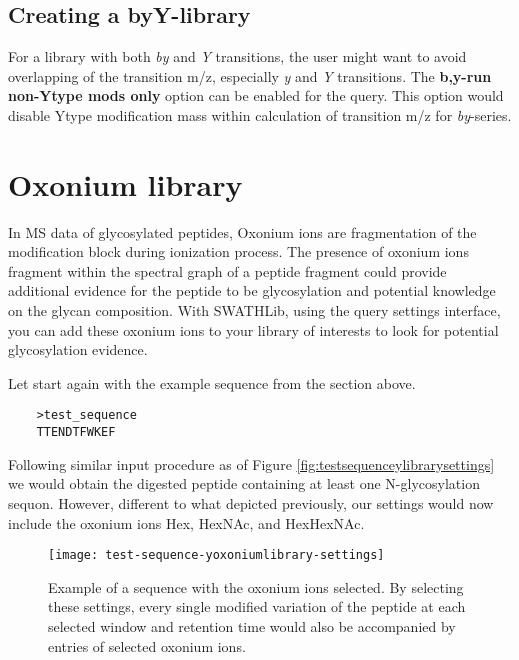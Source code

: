 \documentclass[../manual.tex]{subfiles}
\begin{document}
\subsection{Creating a byY-library}
For a library with both \emph{by} and \emph{Y} transitions, the user might want to avoid overlapping of the transition m/z, especially \emph{y} and \emph{Y} transitions. The \textbf{b,y-run non-Ytype mods only} option can be enabled for the query. This option would disable Ytype modification mass within calculation of transition m/z for \emph{by}-series.

\section{Oxonium library}
In MS data of glycosylated peptides, Oxonium ions are fragmentation of the modification block during ionization process. The presence of oxonium ions fragment within the spectral graph of a peptide fragment could provide additional evidence for the peptide to be glycosylation and potential knowledge on the glycan composition. With SWATHLib, using the query settings interface, you can add these oxonium ions to your library of interests to look for potential glycosylation evidence.\par

Let start again with the example sequence from the section above.\par
\begin{verbatim}
	>test_sequence
	TTENDTFWKEF
\end{verbatim}

Following similar input procedure as of Figure \ref{fig:testsequenceylibrarysettings} we would obtain the digested peptide containing at least one N-glycosylation sequon. However, different to what depicted previously, our settings would now include the oxonium ions Hex, HexNAc, and HexHexNAc.\par

\begin{figure}[H]
	\centering
	\begin{framed}
        \centering
        \begin{adjustbox}{width=1\textwidth}
			\texttt{[image: test-sequence-yoxoniumlibrary-settings]}
		\end{adjustbox}
		\caption{Example of a sequence with the oxonium ions selected. By selecting these settings, every single modified variation of the peptide at each selected window and retention time would also be accompanied by entries of selected oxonium ions.}\label{fig:testsequenceyoxoniumlibrarysettings}
	\end{framed}
\end{figure}
\end{document}
